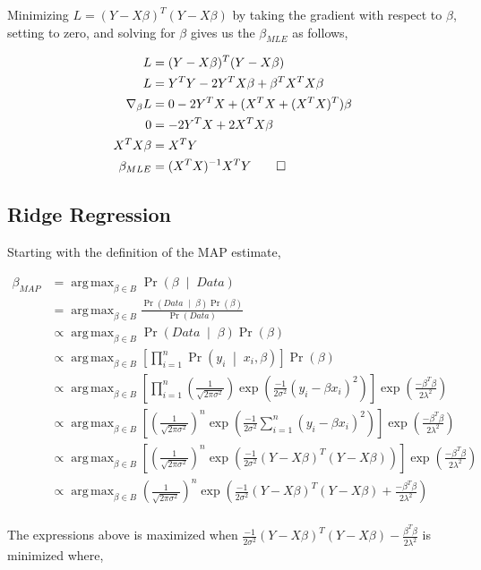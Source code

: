 \documentclass[letterpaper,10pt]{article} %
\newcommand{\pipe}{\;\middle\vert\;}
\newcommand{\condp}[2]{\Pr\left( #1 \pipe #2 \right)}
\newcommand{\pr}[1]{\Pr\left( #1 \right)}
\newcommand{\condpb}[2]{\frac{\condp{#2}{#1}\pr{#1}}{\pr{#2}}}
\DeclareMathOperator*{\argmax}{arg\,max}
\newcommand{\prove}[1]{
\begin{Proof}
\begin{align*}
#1
\end{align*}
\end{Proof}
}
\begin{document}
Minimizing $L=(Y-X\beta)^T(Y-X\beta)$ by taking the gradient with respect to $\beta$, setting to zero, and solving for $\beta$ gives us the $\beta_{MLE}$ as follows,

\prove{
L &= (Y-X\beta)^T(Y-X\beta) \\
L &= Y^TY -2Y^TX\beta+\beta^TX^TX\beta \\
\nabla_{\beta}L &= 0 - 2Y^TX + (X^TX +(X^TX)^T)\beta \\
0 &= -2Y^TX+2X^TX\beta \\
X^TX\beta &= X^TY \\
\beta_{MLE} &= (X^TX)^{-1}X^TY\qedhere
}

\subsection{Ridge Regression}

Starting with the definition of the MAP estimate,

\begin{align*}
\beta_{MAP} &= \argmax_{\beta \in B} \condp{\beta}{Data}\\
&= \argmax_{\beta \in B} \condpb{\beta}{Data}\\
&\propto \argmax_{\beta \in B} \condp{Data}{\beta}\pr{\beta}\\
&\propto \argmax_{\beta \in B} \left[ \prod_{i=1}^n \condp{y_i}{x_i, \beta}\right] \pr{\beta}\\
&\propto \argmax_{\beta \in B} \left[ \prod_{i=1}^n \left(\frac{1}{\sqrt{2\pi\sigma^2}}\right) \exp\left( \frac{-1}{2\sigma^2} (y_i-\beta x_i)^2 \right) \right] \exp\left(\frac{-\beta^T\beta}{2\lambda^2}\right)\\
&\propto \argmax_{\beta \in B} \left[ \left(\frac{1}{\sqrt{2\pi\sigma^2}}\right)^n \exp\left( \frac{-1}{2\sigma^2} \sum_{i=1}^n (y_i-\beta x_i)^2 \right) \right] \exp\left(\frac{-\beta^T\beta}{2\lambda^2}\right)\\
&\propto \argmax_{\beta \in B} \left[ \left(\frac{1}{\sqrt{2\pi\sigma^2}}\right)^n \exp\left( \frac{-1}{2\sigma^2} (Y-X\beta)^T(Y-X\beta) \right) \right] \exp\left(\frac{-\beta^T\beta}{2\lambda^2}\right)\\
&\propto \argmax_{\beta \in B} \left(\frac{1}{\sqrt{2\pi\sigma^2}}\right)^n \exp\left( \frac{-1}{2\sigma^2} (Y-X\beta)^T(Y-X\beta) + \frac{-\beta^T\beta}{2\lambda^2}\right)\\
\end{align*}

The expressions above is maximized when $\frac{-1}{2\sigma^2}(Y-X\beta)^T(Y-X\beta)-\frac{\beta^T\beta}{2\lambda^2}$ is minimized where,
\end{document}
